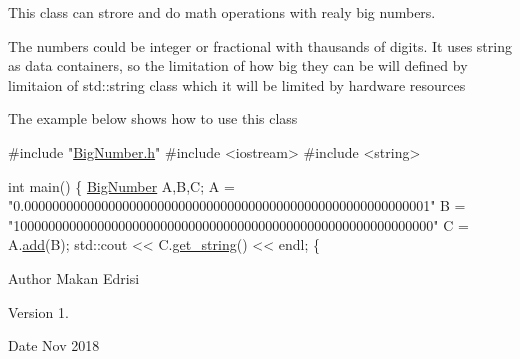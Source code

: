 This class can strore and do math operations with realy big numbers.

The numbers could be integer or fractional with thausands of digits. It uses string as data containers, so the limitation of how big they can be will defined by limitaion of std\+::string class which it will be limited by hardware resources

The example below shows how to use this class 
\begin{DoxyCode}
\textcolor{preprocessor}{#include "\mbox{\hyperlink{_big_number_8h}{BigNumber.h}}"}
\textcolor{preprocessor}{#include <iostream>}
\textcolor{preprocessor}{#include <string>}

\textcolor{keywordtype}{int} main() \{
\mbox{\hyperlink{class_big_number}{BigNumber}} A,B,C;
A = \textcolor{stringliteral}{"0.0000000000000000000000000000000000000000000000000000000001"}
B = \textcolor{stringliteral}{"100000000000000000000000000000000000000000000000000000000000"}
C = A.\mbox{\hyperlink{class_big_number_a5d0fe42db313ea0f5af3f029422d388d}{add}}(B);
std::cout << C.\mbox{\hyperlink{class_big_number_ae2a53447df8a97f9a0e7c75f35e1b7fa}{get\_string}}() << endl;
\{
\end{DoxyCode}


\begin{DoxyAuthor}{Author}
Makan Edrisi 
\end{DoxyAuthor}
\begin{DoxyVersion}{Version}
1. 
\end{DoxyVersion}
\begin{DoxyDate}{Date}
Nov 2018 
\end{DoxyDate}
